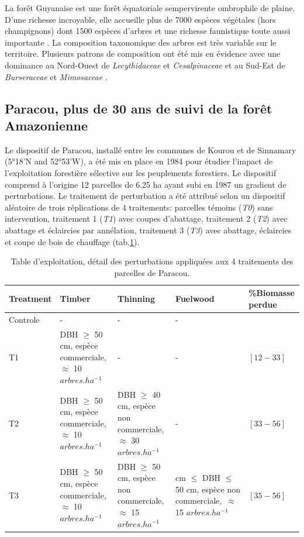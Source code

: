 \documentclass[
  11pt,
  french,
  A4paper,
  extrafontsizes,onecolumn,openright
  ]{memoir}
\begin{document}
La forêt Guyanaise est une forêt équatoriale sempervirente ombrophile de
plaine. D'une richesse incroyable, elle accueille plus de 7000 espèces
végétales (hors champignons) dont 1500 espèces d'arbres et une richesse
faunistique toute aussi importante \autocite{DeNoter2008}. La
composition taxonomique des arbres est très variable sur le territoire.
Plusieurs patrons de composition ont été mis en évidence avec une
dominance au Nord-Ouest de \emph{Lecythidaceae} et \emph{Cesalpinaceae}
et au Sud-Est de \emph{Burseraceae} et \emph{Mimosaceae}
\autocite{Guitet2015}.

\subsection{Paracou, plus de 30 ans de suivi de la forêt
Amazonienne}\label{paracou-plus-de-30-ans-de-suivi-de-la-foret-amazonienne}

Le dispositif de Paracou, installé entre les communes de Kourou et de
Sinnamary (5°18'N and 52°53'W), a été mis en place en 1984 pour étudier
l'impact de l'exploitation forestière sélective sur les peuplements
forestiers. Le dispositif comprend à l'origine 12 parcelles de 6.25 ha
ayant subi en 1987 un gradient de perturbations. Le traitement de
perturbation a été attribué selon un dispositif aléatoire de trois
réplications de 4 traitements: parcelles témoins (\emph{T0}) sans
intervention, traitement 1 (\emph{T1}) avec coupes d'abattage,
traitement 2 (\emph{T2}) avec abattage et éclaircies par annélation,
traitement 3 (\emph{T3}) avec abattage, éclaircies et coupe de bois de
chauffage (tab.\ref{tab:InterventionTable}).

\begingroup\fontsize{7}{9}\selectfont

\begin{longtable}[t]{>{\raggedright\arraybackslash}p{5em}|>{\raggedright\arraybackslash}p{8em}|>{\raggedright\arraybackslash}p{8em}|>{\raggedright\arraybackslash}p{11em}|>{\raggedright\arraybackslash}p{4em}}
\caption{\label{tab:InterventionTable}Table d'exploitation, détail des perturbations appliquées aux 4 traitements des parcelles de Paracou.}\\
\hline
Treatment & Timber & Thinning & Fuelwood & \%Biomasse perdue\\
\hline
Controle & - & - & - & 0\\
\hline
T1 & DBH $\geq$ 50 cm, espèce commerciale, $\approx$ 10   $arbres.ha^{-1}$ & - & - & $[12-33]$\\
\hline
T2 & DBH $\geq$ 50 cm, espèce commerciale, $\approx$ 10  $arbres.ha^{-1}$ & DBH $\geq$ 40 cm, espèce non commerciale, $\approx$ 30   $arbres.ha^{-1}$ & - & $[33-56]$\\
\hline
T3 & DBH $\geq$ 50 cm, espèce commerciale, $\approx$ 10  $arbres.ha^{-1}$ & DBH $\geq$ 50 cm, espèce non commerciale, $\approx$ 15  $arbres.ha^{-1}$ & 40 cm $\leq$ DBH $\leq$ 50 cm, espèce non commerciale,\ $\approx$ 15 $arbres.ha^{-1}$ & $[35-56]$\\
\hline
\end{longtable}
\end{document}
